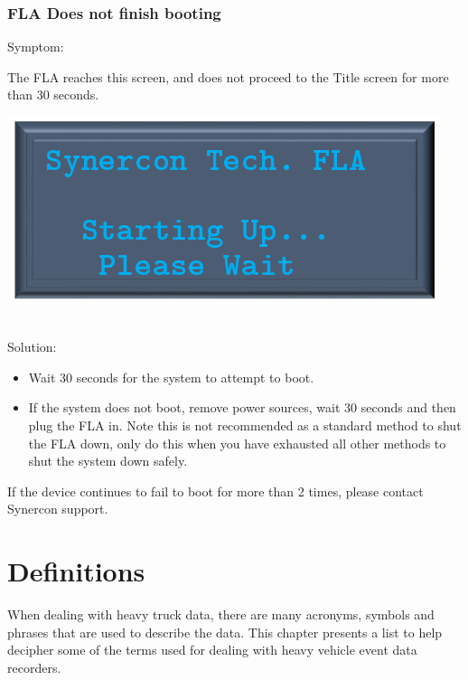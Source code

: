 \documentclass[11pt, oneside]{book}
\begin{document}
\subsection{FLA Does not finish booting}
Symptom:\\
\noindent\begin{minipage}{0.45\textwidth}%
The FLA reaches this screen, and does not proceed to the Title screen for more than 30 seconds.
\end{minipage}%
\hfill%
\begin{minipage}{0.45\textwidth}
\includegraphics[width=\linewidth]{../media/pstricks_files/00_startup_screen}
\end{minipage}\\
Solution:\\
\begin{itemize}
\item Wait 30 seconds for the system to attempt to boot.
\item If the system does not boot, remove power sources, wait 30 seconds and then plug the FLA in. Note this is not recommended as a standard method to shut the FLA down, only do this when you have exhausted all other methods to shut the system down safely.
\end{itemize}
If the device continues to fail to boot for more than 2 times, please contact Synercon support.


\chapter{Definitions}

When dealing with heavy truck data, there are many acronyms, symbols
and phrases that are used to describe the data. This chapter presents
a list to help decipher some of the terms used for dealing with heavy
vehicle event data recorders.
\end{document}
